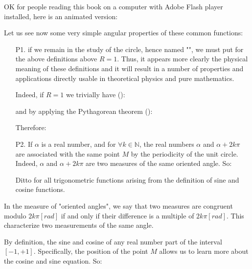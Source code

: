 	OK for people reading this book on a computer with Adobe Flash player installed, here is an animated version:
	\begin{center}
	\centering
	\end{center}

	Let us see now some very simple angular properties of these common functions:
	\begin{enumerate}
		\item[P1.] if we remain in the study of the circle, hence named "\label{trigonometric circle}", we must put for the above definitions above $R=1$. Thus, it appears more clearly the physical meaning of these definitions and it will result in a number of properties and applications directly usable in theoretical physics and pure mathematics.
		
		Indeed, if $R=1$ we trivially have ():
		
		and by applying the Pythagorean theorem ():
		
		Therefore:
		
		
		\item[P2.] If $\alpha$ is a real number, and for $\forall k \in \mathbb{N}$, the real numbers $\alpha$ and $\alpha + 2k\pi$ are associated with the same point $M$ by the periodicity of the unit circle. Indeed, $\alpha$ and $\alpha + 2k\pi$ are two measures of the same oriented angle. So:
		
		Ditto for all trigonometric functions arising from the definition of sine and cosine functions.
	\end{enumerate}

	\begin{tcolorbox}[title=Remark,colframe=black,arc=10pt]
	In the measure of "oriented angles", we say that two measures are congruent modulo $2k\pi [rad]$ if and only if their difference is a multiple of $2k\pi [rad]$. This characterize two measurements of the same angle.
	\end{tcolorbox}
	
	By definition, the sine and cosine of any real number part of the 
 interval $[-1,+1]$. Specifically, the position of the point $M$ allows us to learn more about the cosine and sine equation. So:
 
